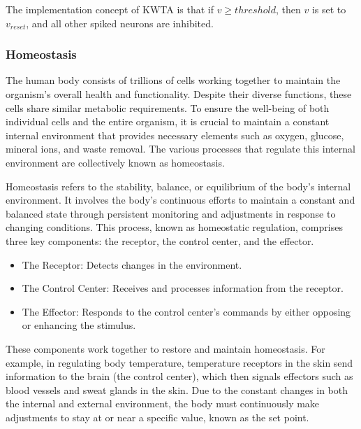 \documentclass[12pt]{article}
\begin{document}
	
	The implementation concept of KWTA is that if  $ v \ge threshold$, then $v$ is set to $v_{reset}$, and all other spiked neurons are inhibited.
	
	
	
	\subsubsection{Homeostasis}
	
The human body consists of trillions of cells working together to maintain the organism's overall health and functionality. Despite their diverse functions, these cells share similar metabolic requirements. To ensure the well-being of both individual cells and the entire organism, it is crucial to maintain a constant internal environment that provides necessary elements such as oxygen, glucose, mineral ions, and waste removal. The various processes that regulate this internal environment are collectively known as homeostasis.

Homeostasis refers to the stability, balance, or equilibrium of the body's internal environment. It involves the body's continuous efforts to maintain a constant and balanced state through persistent monitoring and adjustments in response to changing conditions. This process, known as homeostatic regulation, comprises three key components: the receptor, the control center, and the effector.

\begin{itemize}
\item The Receptor: Detects changes in the environment.
\item The Control Center: Receives and processes information from the receptor.
\item The Effector: Responds to the control center's commands by either opposing or enhancing the stimulus.
\end{itemize}

These components work together to restore and maintain homeostasis. For example, in regulating body temperature, temperature receptors in the skin send information to the brain (the control center), which then signals effectors such as blood vessels and sweat glands in the skin. Due to the constant changes in both the internal and external environment, the body must continuously make adjustments to stay at or near a specific value, known as the set point.
\end{document}
